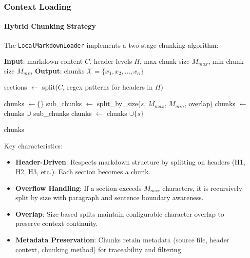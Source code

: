 \documentclass[11pt,a4paper]{article}
\begin{document}
\subsubsection{Context Loading}

\paragraph{Hybrid Chunking Strategy}

The \texttt{LocalMarkdownLoader} implements a two-stage chunking algorithm:

\begin{algorithm}[H]
\caption{Hybrid Markdown Chunking}
\begin{algorithmic}[1]
\State \textbf{Input}: markdown content $C$, header levels $H$, max chunk size $M_{max}$, min chunk size $M_{min}$
\State \textbf{Output}: chunks $\mathcal{X} = \{x_1, x_2, \ldots, x_n\}$

\State {}
\State sections $\gets$ split($C$, regex patterns for headers in $H$)

\State chunks $\gets \{\}$
        \State {}
        \State sub\_chunks $\gets$ split\_by\_size($s$, $M_{max}$, $M_{min}$, overlap)
        \State chunks $\gets$ chunks $\cup$ sub\_chunks
    \Else
        \State chunks $\gets$ chunks $\cup \{s\}$
    \EndIf
\EndFor

\State \Return chunks
\end{algorithmic}
\end{algorithm}

Key characteristics:

\begin{itemize}
    \item \textbf{Header-Driven}: Respects markdown structure by splitting on headers (H1, H2, H3, etc.). Each section becomes a chunk.

    \item \textbf{Overflow Handling}: If a section exceeds $M_{max}$ characters, it is recursively split by size with paragraph and sentence boundary awareness.

    \item \textbf{Overlap}: Size-based splits maintain configurable character overlap to preserve context continuity.

    \item \textbf{Metadata Preservation}: Chunks retain metadata (source file, header context, chunking method) for traceability and filtering.
\end{itemize}
\end{document}
